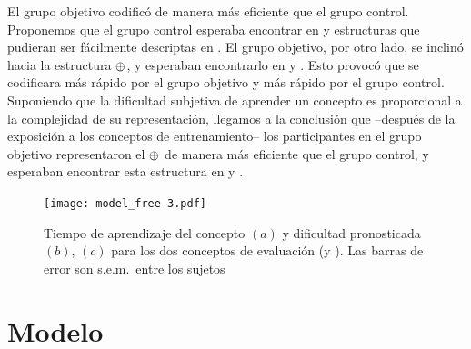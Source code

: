 
El grupo objetivo codificó \testa de manera más eficiente que el grupo control. Proponemos que el grupo control esperaba encontrar en \testa y \testb estructuras que pudieran ser fácilmente descriptas en \grambool. El grupo objetivo, por otro lado, se inclinó hacia la estructura $\oplus$, y esperaban encontrarlo en \testa y \testb. Esto provocó que \testa se codificara más rápido por el grupo objetivo y \testb más rápido por el grupo control. Suponiendo que la dificultad subjetiva de aprender un concepto es proporcional a la complejidad de su representación, llegamos a la conclusión que --después de la exposición a los conceptos de entrenamiento-- los participantes en el grupo objetivo representaron el $\oplus$ de manera más eficiente que el grupo control, y esperaban encontrar esta estructura en \testa y \testb.



\begin{figure}[t!]
      \texttt{[image: model\_free-3.pdf]}
      \centering
      \caption{Tiempo de aprendizaje del concepto $(a)$ y dificultad pronosticada $(b)$, $(c)$ para los dos conceptos de evaluación (\testa y \testb). Las barras de error son s.e.m.\ entre los sujetos}
      \label{model free}
   \end{figure}
\section{Modelo}




